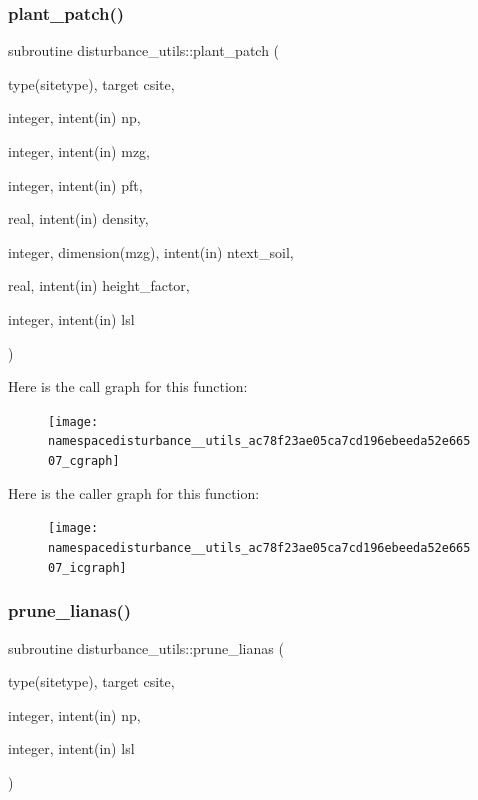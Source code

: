 \subsubsection{\texorpdfstring{plant\+\_\+patch()}{plant\_patch()}}
{\footnotesize\ttfamily subroutine disturbance\+\_\+utils\+::plant\+\_\+patch (\begin{DoxyParamCaption}\item[{type(sitetype), target}]{csite,  }\item[{integer, intent(in)}]{np,  }\item[{integer, intent(in)}]{mzg,  }\item[{integer, intent(in)}]{pft,  }\item[{real, intent(in)}]{density,  }\item[{integer, dimension(mzg), intent(in)}]{ntext\+\_\+soil,  }\item[{real, intent(in)}]{height\+\_\+factor,  }\item[{integer, intent(in)}]{lsl }\end{DoxyParamCaption})}

Here is the call graph for this function\+:
\nopagebreak
\begin{figure}[H]
\begin{center}
\leavevmode
\texttt{[image: namespacedisturbance\_\_utils\_ac78f23ae05ca7cd196ebeeda52e66507\_cgraph]}
\end{center}
\end{figure}
Here is the caller graph for this function\+:
\nopagebreak
\begin{figure}[H]
\begin{center}
\leavevmode
\texttt{[image: namespacedisturbance\_\_utils\_ac78f23ae05ca7cd196ebeeda52e66507\_icgraph]}
\end{center}
\end{figure}
\mbox{\label{namespacedisturbance__utils_adea8e04f93328f6e7137a5c490d0615a}} 
\subsubsection{\texorpdfstring{prune\+\_\+lianas()}{prune\_lianas()}}
{\footnotesize\ttfamily subroutine disturbance\+\_\+utils\+::prune\+\_\+lianas (\begin{DoxyParamCaption}\item[{type(sitetype), target}]{csite,  }\item[{integer, intent(in)}]{np,  }\item[{integer, intent(in)}]{lsl }\end{DoxyParamCaption})}

